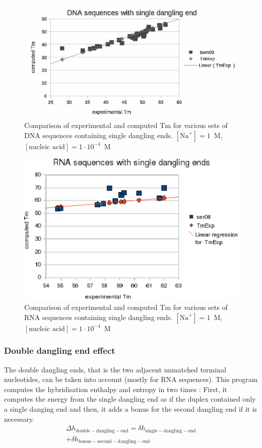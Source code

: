 \documentclass{article}
\begin{document}
\begin{figure}[h]
\includegraphics{images/DNASingleDanglingEnd.eps}
\caption{Comparison of experimental and computed Tm for various sets of
 DNA sequences containing single dangling ends. $[\mbox{Na}^+] = 1$~M, $[\mbox{nucleic acid}] = 1\cdot{}10^{-4}$~M}
\end{figure}

\begin{figure}[h]
\includegraphics{images/RNASingleDanglingEnd.eps}
\caption{Comparison of experimental and computed Tm for various sets of
 RNA sequences containing single dangling ends. $[\mbox{Na}^+] = 1$~M, $[\mbox{nucleic acid}] = 1\cdot{}10^{-4}$~M}
\end{figure}

\subsubsection{Double dangling end effect}

The double dangling ends, that is the two adjacent unmatched terminal nucleotides, can be taken into
account (mostly for RNA sequences). This program computes the hybridisation enthalpy and entropy in two times :
First, it computes the energy from the single dangling end as if the duplex contained
only a single danging end and then, it adds a bonus for the second dangling end if it is necessary. 
\begin{multline*}
\Delta{}h_\mathrm{double-dangling-end} =
\delta{}h_\mathrm{single-dangling-end} \\ + 
\delta{}h_\mathrm{bonus-second-dangling-end}\\
\end{multline*}
\end{document}
